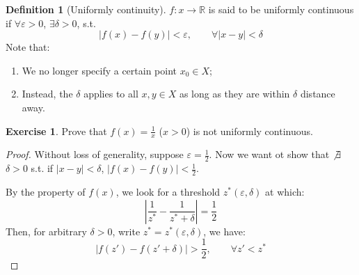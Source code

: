 \documentclass[12pt]{article}
\newcommand{\R}{{\mathbb R}}
\theoremstyle{definition}
\newtheorem{definition}[theorem]{Definition}
\newtheorem{exercise}[theorem]{Exercise}
\theoremstyle{plain}
\begin{document}
\begin{definition}
    [Uniformly continuity]
    $f : x \to \R$ is said to be uniformly continuous if $\forall \varepsilon > 
    0$, $\exists \delta > 0$, s.t. 
    \[
        |f(x) - f(y)| < \varepsilon, \qquad \forall |x - y| < \delta
    \]
    Note that: 
    \begin{enumerate}
        \item We no longer specify a certain point $x_0 \in X$;
        \item Instead, the $\delta$ applies to all $x,y\in X$ as long 
            as they are within $\delta$ distance away.
    \end{enumerate}
\end{definition}
\begin{exercise}
    Prove that $f(x) = \frac{1}{x}$ ($x > 0$) is not uniformly continuous.
    \begin{proof}
        Without loss of generality, suppose $\varepsilon = \frac{1}{2}$. Now we 
        want ot show that $\not\exists$ $\delta > 0$ s.t. if $|x-y| < \delta$, 
        $|f(x) - f(y)| < \frac{1}{2}$. 

        By the property of $f(x)$, we look for a threshold $z^*(\varepsilon, 
        \delta)$ at which:
        \[
            \left| \frac{1}{z^*} - \frac{1}{z^* + \delta}\right| = 
            \frac{1}{2}
        \]
        Then, for arbitrary $\delta> 0$, write $z^* = z^*(\varepsilon, \delta)$, 
        we have:
        \[
            |f(z') - f(z' + \delta)| > \frac{1}{2}, \qquad \forall z' < z^*
        \]
    \end{proof}
\end{exercise}



\end{document}
